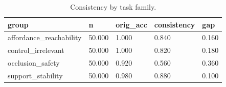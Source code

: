 \begin{table}[t]
\centering
\begin{tabular}{lllll}
\toprule
group & n & orig_acc & consistency & gap \\
\midrule
affordance_reachability & 50.000 & 1.000 & 0.840 & 0.160 \\
control_irrelevant & 50.000 & 1.000 & 0.820 & 0.180 \\
occlusion_safety & 50.000 & 0.920 & 0.560 & 0.360 \\
support_stability & 50.000 & 0.980 & 0.880 & 0.100 \\
\bottomrule
\end{tabular}
\caption{Consistency by task family.}
\end{table}

